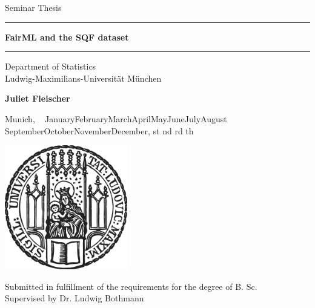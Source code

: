 \documentclass[12pt]{article}
\newcommand{\mytitle}{FairML and the SQF dataset}
\newcommand{\myname}{\large Juliet Fleischer}
\newcommand{\mysupervisor}{Dr. Ludwig Bothmann}
\newcommand{\thesuffix}[1]{%
  \ifnum#1=1 st%
  \else\ifnum#1=2 nd%
  \else\ifnum#1=3 rd%
  \else th%
  \fi\fi\fi}
\newcommand{\mydate}{%
  ~\ifcase\month\or
  January\or February\or March\or April\or May\or June\or July\or August\or
  September\or October\or November\or December\fi, \the\day\thesuffix{\day} \number\year}
\begin{document}
 
\begin{titlepage}
\begin{center}
    
\LARGE
Seminar Thesis

\vspace{0.5cm}
      
\rule{\textwidth}{1.5pt}
\LARGE
\textbf{\mytitle}
\rule{\textwidth}{1.5pt}
   
\vspace{0.5cm}
      
\large
Department of Statistics \\
Ludwig-Maximilians-Universität München

\vfill

\Large
\textbf{\myname}

\vfill

\large

Munich, \mydate
      
\vfill

\includegraphics[width = 0.4\textwidth]{../figures/sigillum.png}

\vfill

\normalsize
Submitted in fulfillment of the requirements for the degree of B. Sc.
\\
Supervised by \mysupervisor

\end{center}
\end{titlepage}


\newpage
\begin{abstract}

In this study we provide an introduction to the most common fairness definitions,
illustrating them with the example of the SQF dataset.

\end{abstract}
\newpage
\end{document}
